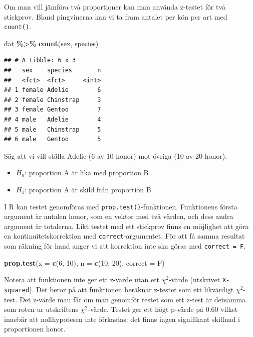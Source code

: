 \documentclass[
]{book}
\newenvironment{Shaded}{\begin{snugshade}}{\end{snugshade}}
\newcommand{\AttributeTok}[1]{\textcolor[rgb]{0.13,0.29,0.53}{#1}}
\newcommand{\DecValTok}[1]{\textcolor[rgb]{0.00,0.00,0.81}{#1}}
\newcommand{\FunctionTok}[1]{\textcolor[rgb]{0.13,0.29,0.53}{\textbf{#1}}}
\newcommand{\NormalTok}[1]{#1}
\newcommand{\SpecialCharTok}[1]{\textcolor[rgb]{0.81,0.36,0.00}{\textbf{#1}}}
\providecommand{\tightlist}{%
  \setlength{\itemsep}{0pt}\setlength{\parskip}{0pt}}
\theoremstyle{definition}
\theoremstyle{definition}
\theoremstyle{definition}
\theoremstyle{definition}
\theoremstyle{remark}
\begin{document}
Om man vill jämföra två proportioner kan man använda z-testet för två stickprov. Bland pingvinerna kan vi ta fram antalet per kön per art med \texttt{count()}.

\begin{Shaded}
\begin{Highlighting}[]
\NormalTok{dat }\SpecialCharTok{\%\textgreater{}\%} \FunctionTok{count}\NormalTok{(sex, species)}
\end{Highlighting}
\end{Shaded}

\begin{verbatim}
## # A tibble: 6 x 3
##   sex    species       n
##   <fct>  <fct>     <int>
## 1 female Adelie        6
## 2 female Chinstrap     3
## 3 female Gentoo        7
## 4 male   Adelie        4
## 5 male   Chinstrap     5
## 6 male   Gentoo        5
\end{verbatim}

Säg att vi vill ställa Adelie (6 av 10 honor) mot övriga (10 av 20 honor).

\begin{itemize}
\tightlist
\item
  \(H_0\): proportion A är lika med proportion B
\item
  \(H_1\): proportion A är skild från proportion B
\end{itemize}

I R kan testet genomföras med \texttt{prop.test()}-funktionen. Funktionens första argument är antalen honor, som en vektor med två värden, och dess andra argument är totalerna. Likt testet med ett stickprov finns en möjlighet att göra en kontinuitetskorrektion med \texttt{correct}-argumentet. För att få samma resultat som räkning för hand anger vi att korrektion inte ska göras med \texttt{correct\ =\ F}.

\begin{Shaded}
\begin{Highlighting}[]
\FunctionTok{prop.test}\NormalTok{(}\AttributeTok{x =} \FunctionTok{c}\NormalTok{(}\DecValTok{6}\NormalTok{, }\DecValTok{10}\NormalTok{), }\AttributeTok{n =} \FunctionTok{c}\NormalTok{(}\DecValTok{10}\NormalTok{, }\DecValTok{20}\NormalTok{), }\AttributeTok{correct =}\NormalTok{ F)}
\end{Highlighting}
\end{Shaded}

Notera att funktionen inte ger ett z-värde utan ett \(\chi^2\)-värde (utskrivet \texttt{X-squared}). Det beror på att funktionen beräknar z-testet som ett likvärdigt \(\chi^2\)-test. Det z-värde man får om man genomför testet som ett z-test är detsamma som roten ur utskriftens \(\chi^2\)-värde. Testet ger ett högt p-värde på 0.60 vilket innebär att nollhypotesen inte förkastas: det finns ingen signifikant skillnad i proportionen honor.
\end{document}
